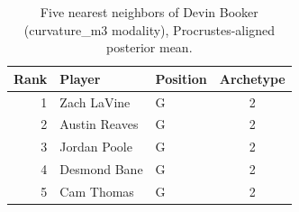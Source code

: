 \begin{table}[htbp]
  \centering\small
  \begin{tabular}{rllc}
    \toprule
    Rank & Player & Position & Archetype \\
    \midrule
    1 & Zach LaVine & G & 2 \\
    2 & Austin Reaves & G & 2 \\
    3 & Jordan Poole & G & 2 \\
    4 & Desmond Bane & G & 2 \\
    5 & Cam Thomas & G & 2 \\
    \bottomrule
  \end{tabular}
  \caption{Five nearest neighbors of Devin Booker (curvature_m3 modality), Procrustes-aligned posterior mean.}
  \label{tab:Devin_Booker_neighbors_curvature_m3}
\end{table}

